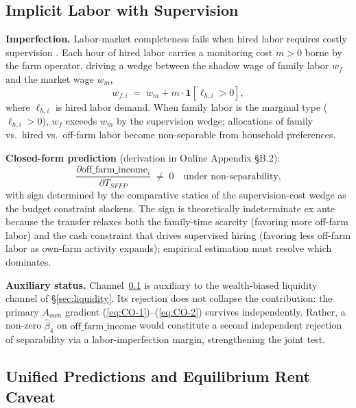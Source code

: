 \documentclass[12pt, a4paper]{article}
\begin{document}
\subsection{Implicit Labor with Supervision}
\label{sec:supervision}

\textbf{Imperfection.} Labor-market completeness fails when hired labor requires costly supervision \citep{EswaranKotwal1986_supervision}. Each hour of hired labor carries a monitoring cost $m > 0$ borne by the farm operator, driving a wedge between the shadow wage of family labor $w_f$ and the market wage $w_m$,
\begin{equation}
w_{f,i} \;=\; w_m + m \cdot \mathbf{1}[\ell_{h,i} > 0],
\label{eq:EK-wedge}
\end{equation}
where $\ell_{h,i}$ is hired labor demand. When family labor is the marginal type ($\ell_{h,i} > 0$), $w_f$ exceeds $w_m$ by the supervision wedge; allocations of family vs.\ hired vs.\ off-farm labor become non-separable from household preferences.

\textbf{Closed-form prediction} (derivation in Online Appendix \S B.2):
\begin{equation}
\boxed{\frac{\partial \text{off\_farm\_income}_i}{\partial T_{SFFP}} \;\ne\; 0 \quad \text{under non-separability,}}
\label{eq:EK-1}
\end{equation}
with sign determined by the comparative statics of the supervision-cost wedge as the budget constraint slackens. The sign is theoretically indeterminate ex ante because the transfer relaxes both the family-time scarcity (favoring more off-farm labor) and the cash constraint that drives supervised hiring (favoring less off-farm labor as own-farm activity expands); empirical estimation must resolve which dominates.

\textbf{Auxiliary status.} Channel~\ref{sec:supervision} is auxiliary to the wealth-biased liquidity channel of \S\ref{sec:liquidity}. Its rejection does not collapse the contribution: the primary $A_{own}$ gradient (\ref{eq:CO-1})--(\ref{eq:CO-2}) survives independently. Rather, a non-zero $\hat\beta_4$ on $\text{off\_farm\_income}$ would constitute a second independent rejection of separability via a labor-imperfection margin, strengthening the joint test.

\subsection{Unified Predictions and Equilibrium Rent Caveat}
\label{sec:predictions}
\end{document}
